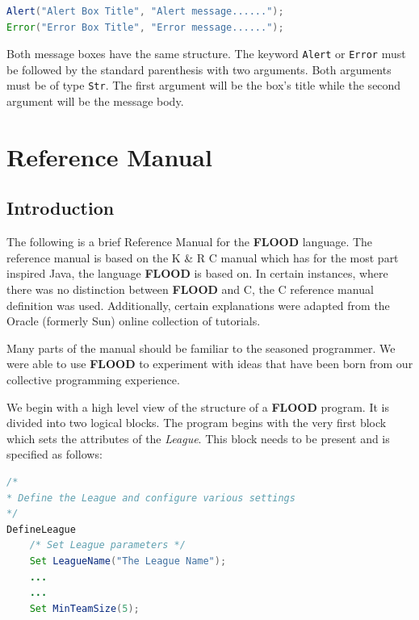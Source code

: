 \documentclass[12pt]{report}
\begin{document}
\begin{singlespace}
\begin{lstlisting}[language=Java,label=some-code,caption={Launching \texttt{Alert} and \texttt{Error} message boxes.}]
Alert("Alert Box Title", "Alert message......");
Error("Error Box Title", "Error message......");
\end{lstlisting}
\end{singlespace}

Both message boxes have the same structure. The keyword \texttt{Alert} or \texttt{Error} must be followed by the standard parenthesis with two arguments. Both arguments must be of type \texttt{Str}. The first argument will be the box's title while the second argument will be the message body.

\chapter{Reference Manual}

\section{Introduction}

The following is a brief Reference Manual for the \textbf{FLOOD} language. The reference manual is based on the K \& R C manual which has for the most part inspired Java, the language \textbf{FLOOD} is based on. In certain instances, where there was no distinction between \textbf{FLOOD} and C, the C reference manual definition was used. Additionally, certain explanations were adapted from the Oracle (formerly Sun) online collection of tutorials.

Many parts of the manual should be familiar to the seasoned programmer. We were able to use \textbf{FLOOD} to experiment with ideas that have been born from our collective programming experience. 

We begin with a high level view of the structure of a \textbf{FLOOD} program. It is divided into two logical blocks. The program begins with the very first block which sets the attributes of the \textit{League}. This block needs to be present and is specified as follows:

\begin{singlespace}
\begin{lstlisting}[language=Java,label=some-code,caption={\texttt{DefineLeague}}]
/*
* Define the League and configure various settings
*/
DefineLeague
	/* Set League parameters */
	Set LeagueName("The League Name");
	...
	...
	Set MinTeamSize(5);
\end{lstlisting}
\end{singlespace}
\end{document}
